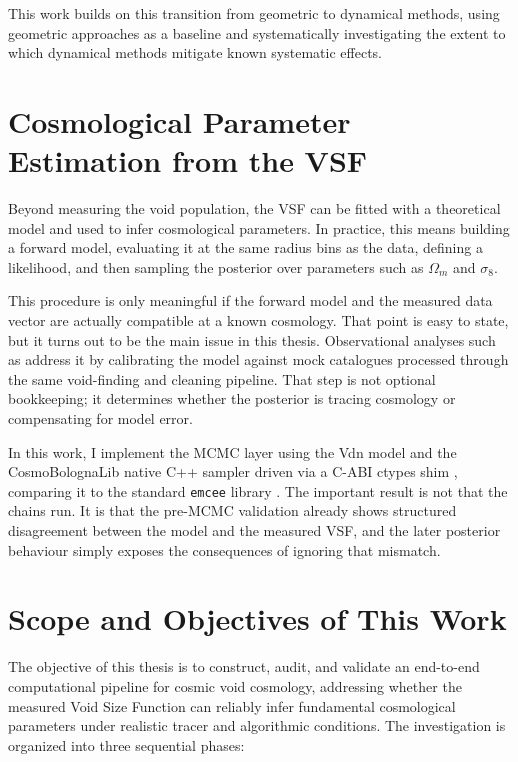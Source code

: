 \documentclass[12pt]{report}
\begin{document}
This work builds on this transition from geometric to dynamical methods, using geometric approaches as a baseline and systematically investigating the extent to which dynamical methods mitigate known systematic effects.


\section{Cosmological Parameter Estimation from the VSF}
\label{sec:intro_mcmc}

Beyond measuring the void population, the VSF can be fitted with a theoretical model and used to infer cosmological parameters. In practice, this means building a forward model, evaluating it at the same radius bins as the data, defining a likelihood, and then sampling the posterior over parameters such as $\Omega_m$ and $\sigma_8$.

This procedure is only meaningful if the forward model and the measured data vector are actually compatible at a known cosmology. That point is easy to state, but it turns out to be the main issue in this thesis. Observational analyses such as \citet{Contarini2023} address it by calibrating the model against mock catalogues processed through the same void-finding and cleaning pipeline. That step is not optional bookkeeping; it determines whether the posterior is tracing cosmology or compensating for model error.

In this work, I implement the MCMC layer using the Vdn model and the CosmoBolognaLib native C++ sampler \citep{Marulli2016} driven via a C-ABI ctypes shim \citep{GoodmanWeare2010}, comparing it to the standard \texttt{emcee} library \citep{ForemanMackey2013}. The important result is not that the chains run. It is that the pre-MCMC validation already shows structured disagreement between the model and the measured VSF, and the later posterior behaviour simply exposes the consequences of ignoring that mismatch.


\section{Scope and Objectives of This Work}

The objective of this thesis is to construct, audit, and validate an end-to-end computational pipeline for cosmic void cosmology, addressing whether the measured Void Size Function can reliably infer fundamental cosmological parameters under realistic tracer and algorithmic conditions. The investigation is organized into three sequential phases:
\end{document}
